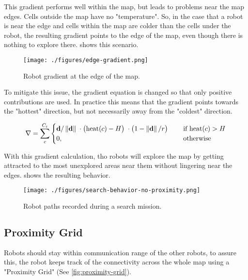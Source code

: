 This gradient performs well within the map, but leads to problems near the map edges. Cells outside the map have no "temperature". {\color{red}So}, in the case that a robot is near the edge and cells within the map are colder than the cells under the robot, the resulting gradient points to the edge of the map, even though there is nothing to explore there.  shows this scenario.

\begin{figure}[h]
    \begin{center}
        \texttt{[image: ./figures/edge-gradient.png]}
    \end{center}
    \caption{Robot gradient at the edge of the map.}
    \label{fig:edge-gradient}
\end{figure}

To mitigate this issue, the gradient equation is changed so that only positive contributions are used. In practice this means that the gradient points towards the "hottest" direction, but not necessarily away from the "coldest" direction.

\begin{equation}
\label{eq:robot-gradient}
    \nabla = \sum_c^{C_\mathrm{r}}
    \begin{cases}
        \mathbf{d}/\left\lVert\mathbf{d}\right\rVert      \; \cdot
        \big(\mathrm{heat}(c) - H\big)    \; \cdot
        \big(1 - \left\lVert\mathbf{d}\right\rVert/r\big) \; \quad &\text{if } \mathrm{heat}(c) > H
        \\
        0, \quad &\text{otherwise}
    \end{cases}
\end{equation}

With this gradient calculation, tho robots will explore the map by getting attracted to the most unexplored areas near them without lingering near the edges.  shows the resulting behavior.

\begin{figure}[h]
    \begin{center}
        \texttt{[image: ./figures/search-behavior-no-proximity.png]}
    \end{center}
    \caption{Robot paths recorded during a search mission.}
    \label{fig:search-no-proximity}
\end{figure}

\subsection{Proximity Grid}
Robots should stay within communication range of the other robots, to assure this, the robot keeps track of the connectivity {\color{red} across} the whole map using a "Proximity Grid" (See \cref{fig:proximity-grid}).

